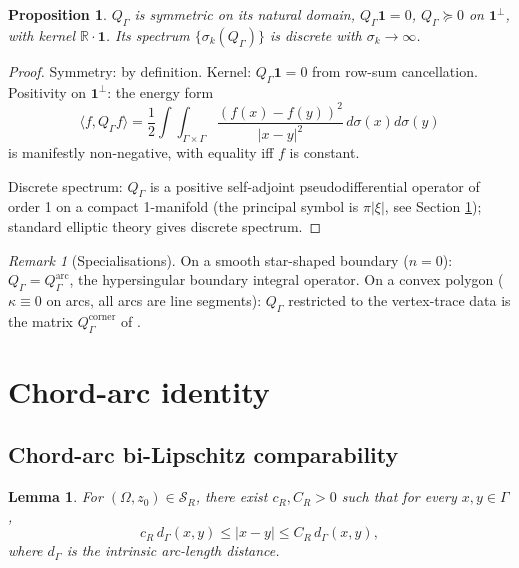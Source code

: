 \documentclass[11pt,reqno]{amsart}
\theoremstyle{plain}
\newtheorem{proposition}[theorem]{Proposition}
\newtheorem{lemma}[theorem]{Lemma}
\theoremstyle{definition}
\theoremstyle{remark}
\newtheorem{remark}[theorem]{Remark}
\newcommand{\Reals}{\mathbb{R}}
\newcommand{\Scal}{\mathcal{S}}
\newcommand{\Qop}{Q}
\begin{document}
\begin{proposition}\label{prop:Q-properties}
$\Qop_\Gamma$ is symmetric on its natural domain, $\Qop_\Gamma\mathbf{1} = 0$, $\Qop_\Gamma \succeq 0$ on $\mathbf{1}^\perp$, with kernel $\Reals \cdot \mathbf{1}$. Its spectrum $\{\sigma_k(\Qop_\Gamma)\}$ is discrete with $\sigma_k \to \infty$.
\end{proposition}

\begin{proof}
Symmetry: by definition. Kernel: $\Qop_\Gamma\mathbf{1} = 0$ from row-sum cancellation. Positivity on $\mathbf{1}^\perp$: the energy form
\[
\langle f, \Qop_\Gamma f\rangle = \frac{1}{2}\int\int_{\Gamma\times\Gamma}\frac{(f(x)-f(y))^2}{|x-y|^2}\, d\sigma(x)d\sigma(y)
\]
is manifestly non-negative, with equality iff $f$ is constant.

Discrete spectrum: $\Qop_\Gamma$ is a positive self-adjoint pseudodifferential operator of order 1 on a compact 1-manifold (the principal symbol is $\pi|\xi|$, see Section \ref{sec:chord-arc}); standard elliptic theory gives discrete spectrum.
\end{proof}

\begin{remark}[Specialisations]\label{rem:Q-special-cases}
On a smooth star-shaped boundary ($n=0$): $\Qop_\Gamma = \Qop_\Gamma^{\mathrm{arc}}$, the hypersingular boundary integral operator. On a convex polygon ($\kappa\equiv 0$ on arcs, all arcs are line segments): $\Qop_\Gamma$ restricted to the vertex-trace data is the matrix $\Qop_\Gamma^{\mathrm{corner}}$ of \cite{GulatiPolygons}.
\end{remark}

\section{Chord-arc identity}\label{sec:chord-arc}

\subsection{Chord-arc bi-Lipschitz comparability}\label{ss:chord-arc-bound}

\begin{lemma}\label{lem:chord-arc-star}
For $(\Omega, z_0) \in \Scal_R$, there exist $c_R, C_R > 0$ such that for every $x, y \in \Gamma$,
\[
c_R\, d_\Gamma(x, y) \leq |x - y| \leq C_R\, d_\Gamma(x, y),
\]
where $d_\Gamma$ is the intrinsic arc-length distance.
\end{lemma}
\end{document}
